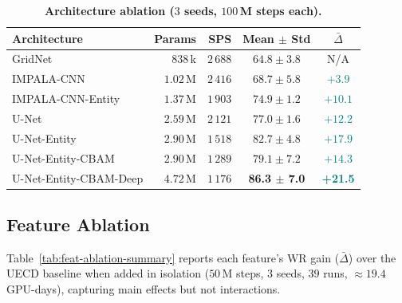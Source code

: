 \documentclass[conference]{IEEEtran}
\newcommand{\code}[1]{{\ttfamily\hyphenchar\font=45\relax #1}}
\begin{document}
\begin{table}[!tb]
\centering
\caption{\textbf{Architecture ablation ($3$ seeds, $100$\,M steps each).}}
\label{tab:arch-ablation-summary}
\footnotesize
\setlength{\tabcolsep}{3.5pt}
\begin{tabularx}{\linewidth}{@{}X | r r | c c@{}}
\toprule
\textbf{Architecture} & \textbf{Params} & \textbf{SPS} & \textbf{Mean $\pm$ Std} & \textbf{$\bar{\Delta}$} \\
\midrule
GridNet                & $838$\,k  & $2\,688$ & $64.8 \pm 3.8$          & N/A \\
IMPALA-CNN                 & $1.02$\,M & $2\,416$ & $68.7 \pm 5.8$          & \textcolor{teal}{$+3.9$} \\
IMPALA-CNN-Entity          & $1.37$\,M & $1\,903$ & $74.9 \pm 1.2$          & \textcolor{teal}{$+10.1$} \\
U-Net                  & $2.59$\,M & $2\,121$ & $77.0 \pm 1.6$          & \textcolor{teal}{$+12.2$} \\
U-Net-Entity           & $2.90$\,M & $1\,518$ & $82.7 \pm 4.8$          & \textcolor{teal}{$+17.9$} \\
U-Net-Entity-CBAM      & $2.90$\,M & $1\,289$ & $79.1 \pm 7.2$          & \textcolor{teal}{$+14.3$} \\
U-Net-Entity-CBAM-Deep & $4.72$\,M & $1\,176$ & \textbf{86.3 $\pm$ 7.0} & \textcolor{teal}{\textbf{+21.5}} \\
\bottomrule
\end{tabularx}
\end{table}

\subsection{Feature Ablation}
\label{sec:feat-ablation}

Table~\ref{tab:feat-ablation-summary} reports each feature's WR gain ($\bar{\Delta}$) over the \code{UECD} baseline when added in isolation ($50$\,M steps, $3$ seeds, $39$ runs, $\approx\!19.4$ GPU-days), capturing main effects but not interactions.
\end{document}
